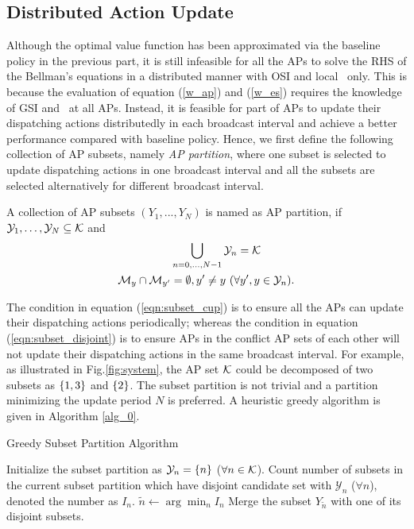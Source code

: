 \subsection{Distributed Action Update}
\label{subsec:ap_alg}
Although the optimal value function has been approximated via the baseline policy in the previous part, it is still infeasible for all the APs to solve the RHS of the Bellman's equations in a distributed manner with OSI and local \brlatency~only.
This is because the evaluation of equation (\ref{w_ap}) and (\ref{w_es}) requires the knowledge of GSI and \brlatency~at all APs.
Instead, it is feasible for part of APs to update their dispatching actions distributedly in each broadcast interval and achieve a better performance compared with baseline policy.
Hence, we first define the following collection of AP subsets, namely \emph{AP partition}, where one subset is selected to update dispatching actions in one broadcast interval and all the subsets are selected alternatively for different broadcast interval.
\begin{definition}[AP Partition]
    A collection of AP subsets $(Y_1, ..., Y_N)$ is named as AP partition, if $\mathcal{Y}_{1}, \dots, \mathcal{Y}_{N} \subseteq \mathcal{K}$ and
    \begin{align}
        &\bigcup_{n=0,\dots,N-1} \mathcal{Y}_{n} = \mathcal{K}
        \label{eqn:subset_cup}
        \\
        \mathcal{M}_{y} \cap \mathcal{M}_{y'} &=\emptyset, y' \neq y~(\forall y',y \in \mathcal{Y}_{n}).
        \label{eqn:subset_disjoint}
    \end{align}
\end{definition}
The condition in equation (\ref{eqn:subset_cup}) is to ensure all the APs can update their dispatching actions periodically; whereas the condition in equation (\ref{eqn:subset_disjoint}) is to ensure APs in the conflict AP sets of each other will not update their dispatching actions in the same broadcast interval.
For example, as illustrated in Fig.\ref{fig:system}, the AP set $\mathcal{K}$ could be decomposed of two subsets as $\{1,3\}$ and $\{2\}$.
The subset partition is not trivial and a partition minimizing the update period $N$ is preferred.
A heuristic greedy algorithm is given in Algorithm \ref{alg_0}.
\begin{algorithm}[ht]
    \caption{Greedy Subset Partition Algorithm}\label{alg_0}
    \DontPrintSemicolon %
    Initialize the subset partition as $\mathcal{Y}_{n} = \{n\}$ ($\forall n\in\mathcal{K}$).\;
    {
        Count number of subsets in the current subset partition which have disjoint candidate set with $\mathcal{Y}_n$ ($\forall n$), denoted the number as $I_{n}$.\;
        $\tilde{n} \gets \arg\min_{n} I_{n}$\;
        Merge the subset $Y_{\tilde{n}}$ with one of its disjoint subsets.\;
    }
\end{algorithm}

